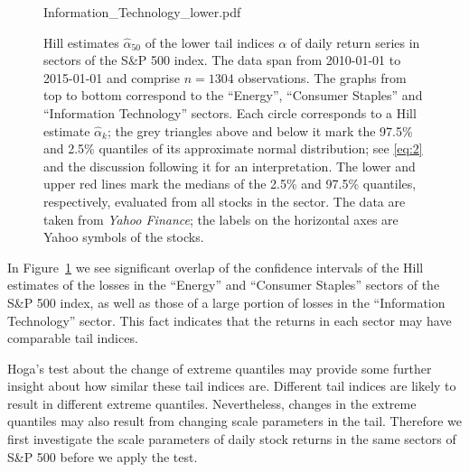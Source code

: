 \documentclass[11pt,a4]{amsart}
\newcommand{\1}{{\mathbf 1}}
\begin{document}
\begin{figure}[htb!]
\begin{minipage}{1.0\linewidth}
    {Information_Technology_lower.pdf}
  \end{minipage}
  \caption{\small Hill estimates $\hat \alpha_{50}$ of the lower tail indices $\alpha$ of
    daily return series in sectors of the S\&P 500
    index. The data span
    from 2010-01-01 to 2015-01-01 and comprise $n=1304$ observations.
The graphs from top to bottom correspond to the ``Energy'',
    ``Consumer Staples'' and ``Information Technology'' sectors.
    Each circle corresponds to a Hill estimate $\hat\alpha_k$; the grey
    triangles above and below it mark the 97.5\% and 2.5\% quantiles
    of its approximate normal distribution; see \eqref{eq:2} and the discussion following it for an 
interpretation.
    The lower and upper red lines mark the medians of the 2.5\% 
    and 97.5\% quantiles, respectively, evaluated from all stocks in the sector.
    The data are taken from {\it Yahoo Finance}; the labels on
    the horizontal axes are Yahoo symbols of the stocks. 
  }\label{fig:1}
\end{figure}

In Figure~\ref{fig:1} we see significant overlap of the confidence intervals of the Hill
estimates of the losses in the ``Energy'' and ``Consumer Staples''
sectors of the S\&P 500 index, as well as those of a 
large portion of losses in the ``Information Technology'' sector.
This fact indicates that the returns in each sector may 
have comparable tail indices.
\par
Hoga's \cite{hoga:2016} test about the change of extreme quantiles
may provide some further insight about how similar these tail indices are.
Different tail indices are likely to result in different
extreme quantiles. Nevertheless, changes in the extreme quantiles may also
result from changing scale parameters in the tail. Therefore  we first investigate the scale
parameters of daily stock returns in the same sectors of S\&P 500 before we apply the test.
\end{document}
